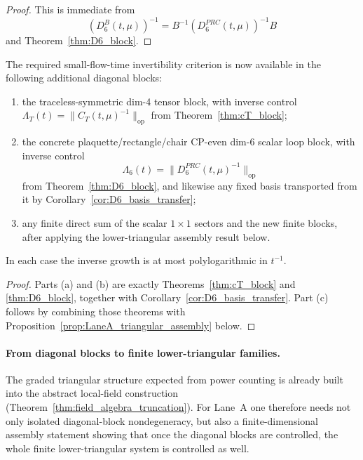 \begin{proof}
This is immediate from
\[
(D_6^{B}(t,\mu))^{-1}=B^{-1}(D_6^{PRC}(t,\mu))^{-1}B
\]
and Theorem~\ref{thm:D6_block}.
\end{proof}

\begin{corollary}\label{cor:Lambda_extended}
The required small-flow-time invertibility criterion is now available in the following additional diagonal blocks:
\begin{enumerate}[label=(\alph*),leftmargin=2.3em]
\item the traceless-symmetric dim-4 tensor block, with inverse control $\Lambda_T(t)=\|C_T(t,\mu)^{-1}\|_{\mathrm{op}}$ from
Theorem~\ref{thm:cT_block};
\item the concrete plaquette/rectangle/chair CP-even dim-$6$ scalar loop block, with inverse control
\[
\Lambda_6(t)=\|D_6^{PRC}(t,\mu)^{-1}\|_{\mathrm{op}}
\]
from Theorem~\ref{thm:D6_block}, and likewise any fixed basis transported from it by Corollary~\ref{cor:D6_basis_transfer};
\item any finite direct sum of the scalar $1\times 1$ sectors and the new finite blocks, after applying the lower-triangular assembly result below.
\end{enumerate}
In each case the inverse growth is at most polylogarithmic in $t^{-1}$.
\end{corollary}

\begin{proof}
Parts (a) and (b) are exactly Theorems~\ref{thm:cT_block} and \ref{thm:D6_block}, together with Corollary~\ref{cor:D6_basis_transfer}.
Part (c) follows by combining those theorems with Proposition~\ref{prop:LaneA_triangular_assembly} below.
\end{proof}
\paragraph{From diagonal blocks to finite lower-triangular families.}
The graded triangular structure expected from power counting is already built into the abstract local-field construction
(Theorem~\ref{thm:field_algebra_truncation}).
For Lane~A one therefore needs not only isolated diagonal-block nondegeneracy, but also a finite-dimensional assembly statement
showing that once the diagonal blocks are controlled, the whole finite lower-triangular system is controlled as well.

